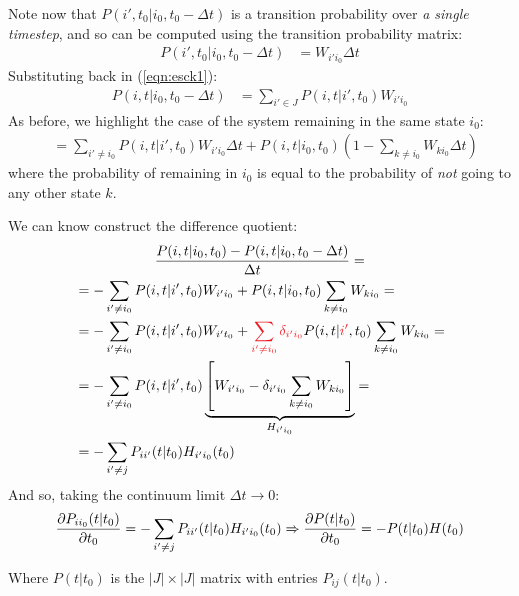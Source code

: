 \documentclass[../template.tex]{subfiles}
\begin{document}
\begin{exo}
\begin{enumerate}
        Note now that $P(i',t_0|i_0,t_0 - \Delta t)$ is a transition probability over \textit{a single timestep}, and so can be computed using the transition probability matrix:
        \begin{align*}
            P(i',t_0|i_0,t_0 - \Delta t) &= W_{i'i_0} \Delta t
        \end{align*} 
        Substituting back in (\ref{eqn:esck1}):
        \begin{align*}
            P(i,t|i_0, t_0 - \Delta t) &=  \sum_{i' \in J} P(i,t|i',t_0) W_{i' i_0}
        \end{align*}
        As before, we highlight the case of the system remaining in the same state $i_0$:
        \begin{align*}
            &= \sum_{i' \neq i_0} P(i,t|i',t_0) W_{i' i_0} \Delta t + P(i,t|i_0,t_0) \left(1-\sum_{k \neq i_0} W_{k i_0} \Delta t\right)
        \end{align*}
        where the probability of remaining in $i_0$ is equal to the probability of \textit{not} going to any other state $k$.
        
        We can know construct the difference quotient:
        \begin{align*}
            \frac{P(i,t|i_0,t_0) - P(i,t|i_0,t_0-\Delta t)}{\Delta t} = \span\\
            &=- \sum_{i' \neq i_0} P(i,t|i',t_0) W_{i' i_0} + P(i,t|i_0,t_0) \sum_{k \neq i_0} W_{k i_0} =\\
            &=- \sum_{i' \neq i_0} P(i,t|i',t_0) W_{i' t_0} + \textcolor{Red}{\sum_{i' \neq i_0} \delta_{i' i_0}} P(i,t|\textcolor{Red}{i'},t_0) \sum_{k \neq i_0} W_{k i_0} =\\
            &=- \sum_{i' \neq i_0} P(i,t|i',t_0) \underbrace{\left[W_{i' i_0} - \delta_{i'i_0} \sum_{k \neq i_0} W_{k i_0}\right]}_{H_{i' i_0}} =\\
            &= -\sum_{i' \neq j} P_{i i'}(t|t_0) H_{i' i_0}(t_0)
        \end{align*} %
        And so, taking the continuum limit $\Delta t \to 0$:
        \begin{align*}
            \pdv{P_{i i_0}(t|t_0)}{t_0} = - \sum_{i' \neq j} P_{i i'}(t|t_0) H_{i' i_0}(t_0) \Rightarrow \pdv{P(t|t_0)}{t_0} = - P(t|t_0) H(t_0)
        \end{align*}

        Where $P(t|t_0)$ is the $|J| \times |J|$ matrix with entries $P_{ij}(t|t_0)$.
        

\end{enumerate}
\end{exo}
\end{document}
